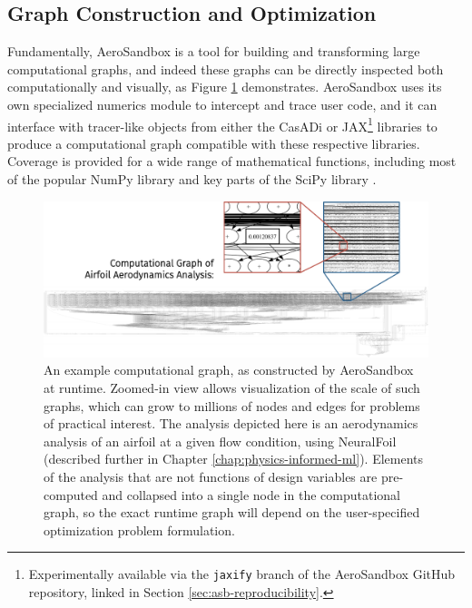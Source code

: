 \subsection{Graph Construction and Optimization}

Fundamentally, AeroSandbox is a tool for building and transforming large computational graphs, and indeed these graphs can be directly inspected both computationally and visually, as Figure \ref{fig:computational-graph-aerosandbox} demonstrates. AeroSandbox uses its own specialized numerics module to intercept and trace user code, and it can interface with tracer-like objects from either the CasADi \cite{casadi} or JAX\footnote{Experimentally available via the \texttt{jaxify} branch of the AeroSandbox GitHub repository, linked in Section \ref{sec:asb-reproducibility}.} \cite{jax} libraries to produce a computational graph compatible with these respective libraries. Coverage is provided for a wide range of mathematical functions, including most of the popular NumPy library \cite{harris_array_2020} and key parts of the SciPy library \cite{scipy}.

\begin{figure}[h]
    \centering
    \includegraphics[width=\textwidth]{../figures/large_computational_graph-crop.pdf}
    \caption{An example computational graph, as constructed by AeroSandbox at runtime. Zoomed-in view allows visualization of the scale of such graphs, which can grow to millions of nodes and edges for problems of practical interest. The analysis depicted here is an aerodynamics analysis of an airfoil at a given flow condition, using NeuralFoil (described further in Chapter \ref{chap:physics-informed-ml}). Elements of the analysis that are not functions of design variables are pre-computed and collapsed into a single node in the computational graph, so the exact runtime graph will depend on the user-specified optimization problem formulation.}
    \label{fig:computational-graph-aerosandbox}
\end{figure}

